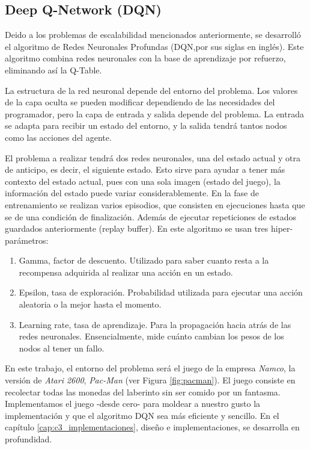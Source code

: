 	\subsection{Deep Q-Network (DQN)}
		Deido a los problemas de escalabilidad mencionados anteriormente, se desarrolló el algoritmo de Redes Neuronales Profundas (DQN,por sus siglas en inglés). Este algoritmo combina redes neuronales con la base de aprendizaje por refuerzo, eliminando así la Q-Table.
		
		La estructura de la red neuronal depende del entorno del problema. Los valores de la capa oculta se pueden modificar dependiendo de las necesidades del programador, pero la capa de entrada y salida depende del problema. La entrada se adapta para recibir un estado del entorno, y la salida tendrá tantos nodos como las acciones del agente. 
		
		El problema a realizar tendrá dos redes neuronales, una del estado actual y otra de anticipo, es decir, el siguiente estado. Esto sirve para ayudar a tener más contexto del estado actual, pues con una sola imagen (estado del juego), la información del estado puede variar considerablemente. En la fase de entrenamiento se realizan varios episodios, que consisten en ejecuciones hasta que se de una condición de finalización. Además de ejecutar repeticiones de estados guardados anteriormente (replay buffer). En este algoritmo se usan tres hiper-parámetros: 
		\begin{enumerate}
			\item Gamma, factor de descuento. Utilizado para saber cuanto resta a la recompensa adquirida al realizar una acción en un estado.
			\item Epsilon, tasa de exploración. Probabilidad utilizada para ejecutar una acción aleatoria o la mejor hasta el momento.
			\item Learning rate, tasa de aprendizaje. Para la propagación hacia atrás de las redes neuronales. Ensencialmente, mide cuánto cambian los pesos de los nodos al tener un fallo.
		\end{enumerate}	
		
		
		
		En este trabajo, el entorno del problema será el juego de la empresa \textit{Namco}, la versión de \textit{Atari 2600}, \textit{Pac-Man} (ver Figura \ref{fig:pacman}). El juego consiste en recolectar todas las monedas del laberinto sin ser comido por un fantasma. Implementamos el juego -desde cero- para moldear a nuestro gusto la implementación y que el algoritmo DQN sea más eficiente y sencillo. En el capítulo \ref{cap:c3_implementaciones}, diseño e implementaciones, se desarrolla en profundidad.
		
